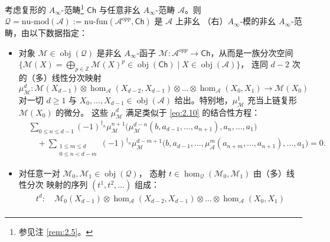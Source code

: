 \begin{Def}\label{def:2.20}
考虑复形的 $A_\infty$-范畴\footnote{参见注 \ref{rem:2.5}。} $\mathsf{Ch}$ 与任意非幺
$A_\infty$-范畴 $\mathcal A$。则 $\mathcal Q=\mathrm{nu\text{-}mod}(\mathcal A):=
\mathrm{nu\text{-}fun}(\mathcal A^{opp},\mathsf{Ch})$ 是 $\mathcal A$ 上非幺
（右）$A_\infty$-模的非幺 $A_\infty$-范畴，由以下数据指定：
\begin{itemize}
  \item 对象 $\mathcal M\in\operatorname{obj}(\mathcal Q)$ 是非幺 $A_\infty$-函子
        $\mathcal M:\mathcal A^{opp}\to\mathsf{Ch}$，从而是一族分次空间
        $\{\mathcal M(X)=\bigoplus_{p\in\mathbb Z}\mathcal M(X)^p\in
        \operatorname{obj}(\mathsf{Ch})\mid X\in\operatorname{obj}(\mathcal A)\}$，
        连同 $d-2$ 次的（多）线性分次映射
        \begin{equation}\label{eq:2.23}
          \mu^d_{\mathcal M}:\mathcal M(X_{d-1})\otimes\hom_{\mathcal A}
          (X_{d-2},X_{d-1})\otimes\dots\otimes\hom_{\mathcal A}(X_0,X_1)
          \longrightarrow\mathcal M(X_0)
        \end{equation}
        对一切 $d\ge 1$ 与 $X_0,\dots,X_{d-1}\in\operatorname{obj}(\mathcal A)$
        给出。特别地，$\mu^1_{\mathcal M}$ 充当上链复形 $\mathcal M(X_0)$ 的微分。
        这些 $\mu^d_{\mathcal M}$ 满足类似于 \eqref{eq:2.10} 的结合性方程：
        \begin{equation}\label{eq:2.24}
          \begin{aligned}
            &\sum_{0\le n\le d-1}(-1)^{\dagger_n}\mu^{n+1}_{\mathcal M}\bigl(
            \mu^{d-n}_{\mathcal M}(b,a_{d-1},\dots,a_{n+1}),a_n,\dots,a_1\bigr)\\
            &\quad+\sum_{\substack{1\le m\le d\\ 0\le n<d-m}}(-1)^{\dagger_n}
            \mu^{d-m+1}_{\mathcal M}\bigl(b,a_{d-1},\dots,\mu^m_{\mathcal A}
            (a_{n+m},\dots,a_{n+1}),\dots,a_1\bigr)=0.
          \end{aligned}
        \end{equation}
  \item 对任意一对 $\mathcal M_0,\mathcal M_1\in\operatorname{obj}(\mathcal Q)$，
        态射 $t\in\hom_{\mathcal Q}(\mathcal M_0,\mathcal M_1)$ 由（多）线性分次
        映射的序列 $(t^1,t^2,\dots)$ 组成：
        \begin{equation}\label{eq:2.25}
          \begin{aligned}
            t^d:\ &\mathcal M_0(X_{d-1})\otimes\hom_{\mathcal A}(X_{d-2},X_{d-1})
            \otimes\dots\otimes\hom_{\mathcal A}(X_0,X_1)\\

\end{aligned}
\end{equation}
\end{itemize}
\end{Def}
